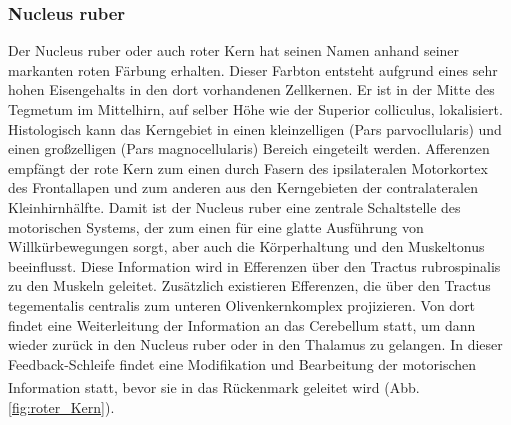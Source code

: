 \documentclass[12pt,a4paper,pdftex]{article}
\begin{document}
\subsubsection*{Nucleus ruber} 
Der Nucleus ruber oder auch roter Kern hat seinen Namen anhand seiner markanten roten Färbung erhalten. Dieser Farbton entsteht aufgrund eines sehr hohen Eisengehalts in den dort vorhandenen Zellkernen. Er ist in der Mitte des Tegmetum im Mittelhirn, auf selber Höhe wie der Superior colliculus, lokalisiert. Histologisch kann das Kerngebiet in einen kleinzelligen (Pars parvocllularis) und einen großzelligen (Pars magnocellularis) Bereich eingeteilt werden. Afferenzen empfängt der rote Kern zum einen durch Fasern des ipsilateralen Motorkortex des Frontallapen und zum anderen aus den Kerngebieten der contralateralen Kleinhirnhälfte. Damit ist der Nucleus ruber eine zentrale Schaltstelle des motorischen Systems, der zum einen für eine glatte Ausführung von Willkürbewegungen sorgt, aber auch die Körperhaltung und den Muskeltonus beeinflusst. Diese Information wird in Efferenzen über den Tractus rubrospinalis zu den Muskeln geleitet. Zusätzlich existieren Efferenzen, die über den Tractus tegementalis centralis zum unteren Olivenkernkomplex projizieren. Von dort findet eine Weiterleitung der Information an das Cerebellum statt, um dann wieder zurück in den Nucleus ruber oder in den Thalamus zu gelangen. In dieser Feedback-Schleife findet eine Modifikation und Bearbeitung der motorischen Information statt, bevor sie in das Rückenmark geleitet wird \textsuperscript{\cite[6]{trepel2011neuroanatomie}} (Abb. \ref{fig:roter_Kern}). 
\end{document}
